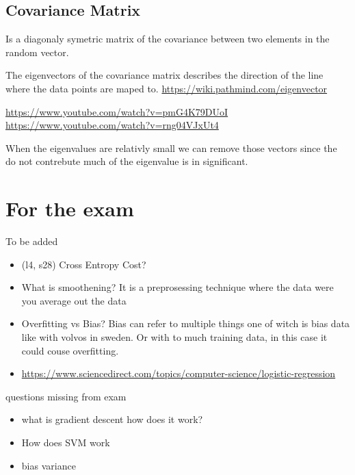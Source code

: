 \documentclass{article}
\begin{document}
\subsection{Covariance Matrix}
Is a diagonaly symetric matrix of the covariance between two elements in the random vector.

The eigenvectors of the covariance matrix describes the direction of the line where the
data points are maped to.
\url{https://wiki.pathmind.com/eigenvector}


\url{https://www.youtube.com/watch?v=pmG4K79DUoI}
\url{https://www.youtube.com/watch?v=rng04VJxUt4}

When the eigenvalues are relativly small we can remove those vectors since the do 
not contrebute much of the eigenvalue is in significant.


\section{For the exam}
To be added 
\begin{itemize}
    \item (l4, s28) Cross Entropy Cost?
    \item What is smoothening? It is a preprosessing technique where the data were you average out the data 
    \item Overfitting vs Bias? Bias can refer to multiple things one of witch is bias data like with volvos in sweden. Or with to much training data, in this case it could couse overfitting.
    \item \url{https://www.sciencedirect.com/topics/computer-science/logistic-regression}
\end{itemize}

questions missing from exam 
\begin{itemize}
    \item what is gradient descent how does it work?
    \item How does SVM work 
    \item bias variance
\end{itemize}
\end{document}
